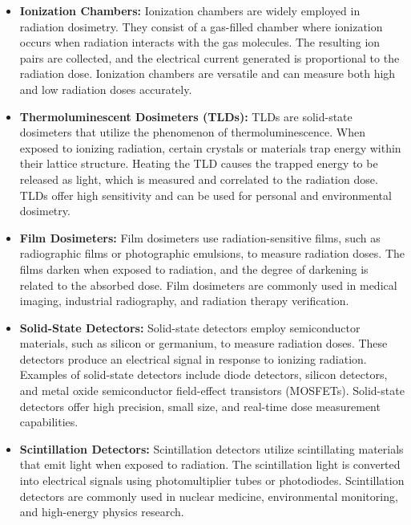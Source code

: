 \documentclass[../../Report.tex]{subfiles}
\begin{document}
        \begin{itemize}
            \item \textbf{Ionization Chambers:} Ionization chambers are widely employed in radiation dosimetry. 
            They consist of a gas-filled chamber where ionization occurs when radiation interacts with the gas molecules. 
            The resulting ion pairs are collected, and the electrical current generated is proportional to the radiation 
            dose. Ionization chambers are versatile and can measure both high and low radiation doses accurately.

            \item \textbf{Thermoluminescent Dosimeters (TLDs): } TLDs are solid-state dosimeters that utilize the phenomenon of 
            thermoluminescence. When exposed to ionizing radiation, certain crystals or materials trap energy within 
            their lattice structure. Heating the TLD causes the trapped energy to be released as light, which is measured 
            and correlated to the radiation dose. TLDs offer high sensitivity and can be used for personal and environmental 
            dosimetry.

            \item \textbf{Film Dosimeters: } Film dosimeters use radiation-sensitive films, such as radiographic films or 
            photographic emulsions, to measure radiation doses. The films darken when exposed to radiation, and the degree 
            of darkening is related to the absorbed dose. Film dosimeters are commonly used in medical imaging, industrial 
            radiography, and radiation therapy verification.

            \item \textbf{Solid-State Detectors: } Solid-state detectors employ semiconductor materials, such as silicon 
            or germanium, to measure radiation doses. These detectors produce an electrical signal in response to ionizing 
            radiation. Examples of solid-state detectors include diode detectors, silicon detectors, and metal oxide 
            semiconductor field-effect transistors (MOSFETs). Solid-state detectors offer high precision, small size, and 
            real-time dose measurement capabilities.

            \item \textbf{Scintillation Detectors: } Scintillation detectors utilize scintillating materials that emit 
            light when exposed to radiation. The scintillation light is converted into electrical signals using 
            photomultiplier tubes or photodiodes. Scintillation detectors are commonly used in nuclear medicine, 
            environmental monitoring, and high-energy physics research.


\end{itemize}
\end{document}
